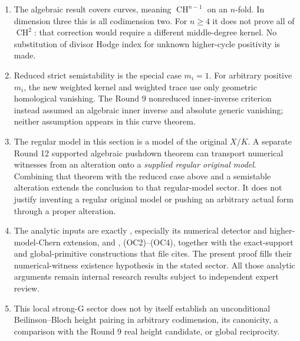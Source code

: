 \begin{enumerate}
\item The algebraic result covers curves, meaning
$\operatorname{CH}^{n-1}$ on an $n$-fold.  In dimension three this is
all codimension two.  For $n\geq4$ it does not prove all of
$\operatorname{CH}^2$: that correction would require a different
middle-degree kernel.  No substitution of divisor Hodge index for
unknown higher-cycle positivity is made.
\item Reduced strict semistability is the special case $m_i=1$.
For arbitrary positive $m_i$, the new weighted kernel and weighted
trace use only geometric homological vanishing.  The Round 9
nonreduced inner-inverse criterion instead assumed an algebraic
inner inverse and absolute generic vanishing; neither assumption
appears in this curve theorem.
\item The regular model in this section is a model of the original
$X/K$.  A separate Round 12 supported algebraic pushdown theorem
can transport numerical witnesses from an alteration onto a
\emph{supplied regular original model}.  Combining that theorem
with the reduced case above and a semistable alteration extends the
conclusion to that regular-model sector.  It does not justify
inventing a regular original model or pushing an arbitrary actual
form through a proper alteration.
\item The analytic inputs are exactly
, especially its
numerical detector and higher-model-Chern extension, and
, (OC2)--(OC4),
together with the exact-support and global-primitive constructions
that file cites.  The present proof fills their numerical-witness
existence hypothesis in the stated sector.  All those analytic
arguments remain internal research results subject to independent
expert review.
\item This local strong-G sector does not by itself establish an
unconditional Beilinson--Bloch height pairing in arbitrary
codimension, its canonicity, a comparison with the Round 9 real
height candidate, or global reciprocity.
\end{enumerate}

